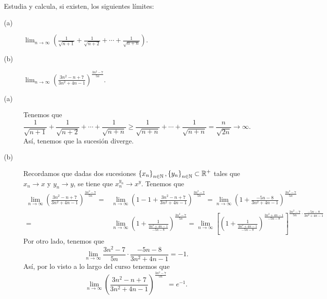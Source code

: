 \documentclass{article}
\begin{document}
\begin{ej}
Estudia y calcula, si existen, los siguientes límites:
\begin{description}
\item[(a)] $\displaystyle \lim_{n \to \infty}\left(\frac{1}{\sqrt{n+1}}+\frac{1}{\sqrt{n+2}}+\cdots + \frac{1}{\sqrt{n + n}}\right) $.
\item[(b)] $\displaystyle \lim_{n \to \infty}\left(\frac{3n^{2}-n+7}{3n^{2}+4n-1}\right)^{\frac{3n^{2}-7}{5n}} $.
\end{description}
\end{ej}
\begin{sol}
\begin{description}
\item[(a)] Tenemos que 
	\[ \frac{1}{\sqrt{n+1}}+\frac{1}{\sqrt{n+2}}+\cdots + \frac{1}{\sqrt{n + n}} \geq \frac{1}{\sqrt{n + n}}+\cdots + \frac{1}{\sqrt{n + n}} = \frac{n}{\sqrt{2n}} \to \infty.\]
Así, tenemos que la sucesión diverge.	
\item[(b)] Recordamos que dadas dos sucesiones $\displaystyle \left\{ x_{n}\right\} _{n\in\mathbb{N}}, \left\{ y_{n}\right\} _{n\in\mathbb{N}} \subset \mathbb{R}^+ $ tales que $\displaystyle x_{n} \to x $ y $\displaystyle y_{n} \to y $, se tiene que $\displaystyle x_{n}^{y_{n}} \to x^{y} $. Tenemos que 
\[
\begin{split}
	\lim_{n \to \infty}\left(\frac{3n^{2}-n+7}{3n^{2}+4n-1}\right)^{\frac{3n^{2}-7}{5n}} = & \lim_{n \to \infty}\left(1 - 1 + \frac{3n^{2}-n+7}{3n^{2}+4n-1}\right)^{\frac{3n^{2}-7}{5n}} = \lim_{n \to \infty}\left(1+\frac{-5n-8}{3n^{2}+4n-1}\right)^{\frac{3n^{2}-7}{5n}} \\
	= & \lim_{n \to \infty}\left(1 + \frac{1}{\frac{3n^{2}+4n-1}{-5n-8}}\right)^{\frac{3n^{2}-7}{5n}} = \lim_{n \to \infty}\left[\left(1 + \frac{1}{\frac{3n^{2}+4n-1}{-5n-8}}\right) ^{\frac{3n^{2}+4n-1}{-5n-8}} \right] ^{\frac{3n^{2}-7}{5n} \cdot \frac{-5n-8}{3n^{2}+4n-1}} 
\end{split}
\]
Por otro lado, tenemos que
\[\lim_{n \to \infty} \frac{3n^{2}-7}{5n} \cdot \frac{-5n-8}{3n^{2}+4n-1} = -1.\]
Así, por lo visto a lo largo del curso tenemos que
\[\lim_{n \to \infty}\left(\frac{3n^{2}-n+7}{3n^{2}+4n-1}\right)^{\frac{3n^{2}-7}{5n}} = e^{-1} .\]
\end{description}
\end{sol}
\end{document}
